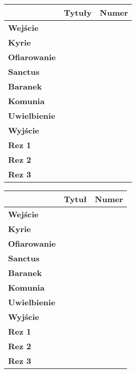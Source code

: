 	
	\begin{tabular}{| p{2.5cm} || p{8cm} | p{1.5cm} |}
  		\hline 
  			 & \textbf{Tytuły} & \textbf{Numer}\\
  		\hline 
  			\textbf{Wejście} & & \\
  		\hline
  			\textbf{Kyrie} & & \\
  		\hline	
  			\textbf{Ofiarowanie} & & \\
  		\hline	
  			\textbf{Sanctus} & & \\
  		\hline	
  			\textbf{Baranek} & & \\
  		\hline
  			\textbf{Komunia} & & \\
  		\hline
  			\textbf{Uwielbienie} & & \\ 
  		\hline
  			\textbf{Wyjście} & & \\
  		\hline
  			\textbf{Rez 1} & & \\
  		\hline
  			\textbf{Rez 2} & & \\
  		\hline
  			\textbf{Rez 3} & & \\
  		\hline
	\end{tabular} 
	
	\hfill \break
	
	\begin{tabular}{| p{2.5cm} || p{8cm} | p{1.5cm} |}
  		\hline 
  			 & \textbf{Tytuł} & \textbf{Numer}\\
  		\hline 
  			\textbf{Wejście} & & \\
  		\hline
  			\textbf{Kyrie} & & \\
  		\hline	
  			\textbf{Ofiarowanie} & & \\
  		\hline	
  			\textbf{Sanctus} & & \\
  		\hline	
  			\textbf{Baranek} & & \\
  		\hline
  			\textbf{Komunia} & & \\
  		\hline
  			\textbf{Uwielbienie} & & \\
  		\hline
  			\textbf{Wyjście} & & \\
  		\hline
  			\textbf{Rez 1} & & \\
  		\hline
  			\textbf{Rez 2} & & \\
  		\hline
  			\textbf{Rez 3} & & \\
  		\hline
	\end{tabular} 
	
	\hfill \break
		
